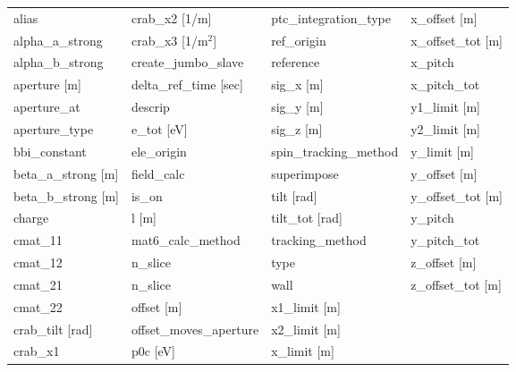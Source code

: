  \begin{tabular}{llll} \toprule
alias                            & crab_x2 [1/m]                    & ptc_integration_type             & x_offset [m]                     \\
alpha_a_strong                   & crab_x3 [1/m$^2$]                & ref_origin                       & x_offset_tot [m]                 \\
alpha_b_strong                   & create_jumbo_slave               & reference                        & x_pitch                          \\
aperture [m]                     & delta_ref_time [sec]             & sig_x [m]                        & x_pitch_tot                      \\
aperture_at                      & descrip                          & sig_y [m]                        & y1_limit [m]                     \\
aperture_type                    & e_tot [eV]                       & sig_z [m]                        & y2_limit [m]                     \\
bbi_constant                     & ele_origin                       & spin_tracking_method             & y_limit [m]                      \\
beta_a_strong [m]                & field_calc                       & superimpose                      & y_offset [m]                     \\
beta_b_strong [m]                & is_on                            & tilt [rad]                       & y_offset_tot [m]                 \\
charge                           & l [m]                            & tilt_tot [rad]                   & y_pitch                          \\
cmat_11                          & mat6_calc_method                 & tracking_method                  & y_pitch_tot                      \\
cmat_12                          & n_slice                          & type                             & z_offset [m]                     \\
cmat_21                          & n_slice                          & wall                             & z_offset_tot [m]                 \\
cmat_22                          & offset [m]                       & x1_limit [m]                     &                                  \\
crab_tilt [rad]                  & offset_moves_aperture            & x2_limit [m]                     &                                  \\
crab_x1                          & p0c [eV]                         & x_limit [m]                      &                                  \\
 \bottomrule
 \end{tabular}
 \vfill
 
